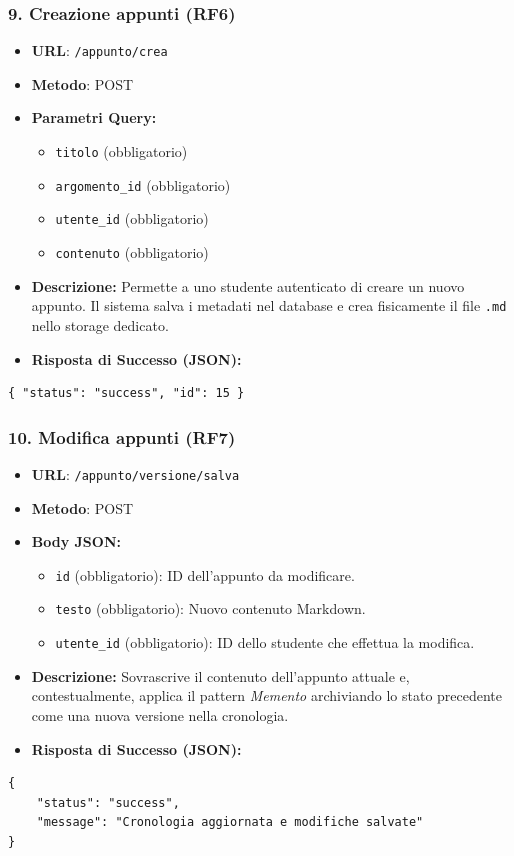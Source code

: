\subsubsection{9. Creazione appunti (RF6)}
\begin{itemize}
    \item \textbf{URL}: \texttt{/appunto/crea}
    \item \textbf{Metodo}: POST
    \item \textbf{Parametri Query:}
        \begin{itemize}
            \item \texttt{titolo} (obbligatorio)
            \item \texttt{argomento\_id} (obbligatorio)
            \item \texttt{utente\_id} (obbligatorio)
            \item \texttt{contenuto} (obbligatorio)
        \end{itemize}
    \item \textbf{Descrizione:} Permette a uno studente autenticato di creare un nuovo appunto. Il sistema salva i metadati nel database e crea fisicamente il file \texttt{.md} nello storage dedicato.
    \item \textbf{Risposta di Successo (JSON):}
\end{itemize}
\begin{verbatim}
{ "status": "success", "id": 15 }
\end{verbatim}

\subsubsection{10. Modifica appunti (RF7)}
\begin{itemize}
    \item \textbf{URL}: \texttt{/appunto/versione/salva}
    \item \textbf{Metodo}: POST
    \item \textbf{Body JSON:}
        \begin{itemize}
            \item \texttt{id} (obbligatorio): ID dell'appunto da modificare.
            \item \texttt{testo} (obbligatorio): Nuovo contenuto Markdown.
            \item \texttt{utente\_id} (obbligatorio): ID dello studente che effettua la modifica.
        \end{itemize}
    \item \textbf{Descrizione:} Sovrascrive il contenuto dell'appunto attuale e, contestualmente, applica il pattern \textit{Memento} archiviando lo stato precedente come una nuova versione nella cronologia.
    \item \textbf{Risposta di Successo (JSON):}
\end{itemize}
\begin{verbatim}
{ 
    "status": "success", 
    "message": "Cronologia aggiornata e modifiche salvate" 
}
\end{verbatim}


